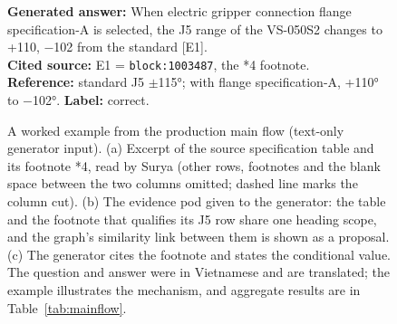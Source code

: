 \begin{figure}[t]
\begin{minipage}[t]{0.26\textwidth}
\textbf{Generated answer:} When electric gripper connection flange specification-A is selected, the J5 range of the VS-050S2 changes to +110, $-$102 from the standard [E1].\\[4pt]
\textbf{Cited source:} E1 = \texttt{block:1003487}, the *4 footnote.\\[4pt]
\textbf{Reference:} standard J5 $\pm$115°; with flange specification-A, +110° to $-$102°. \textbf{Label:} correct.
\end{minipage}
\caption{A worked example from the production main flow (text-only generator input). (a) Excerpt of the source specification table and its footnote *4, read by Surya (other rows, footnotes and the blank space between the two columns omitted; dashed line marks the column cut). (b) The evidence pod given to the generator: the table and the footnote that qualifies its J5 row share one heading scope, and the graph's similarity link between them is shown as a proposal. (c) The generator cites the footnote and states the conditional value. The question and answer were in Vietnamese and are translated; the example illustrates the mechanism, and aggregate results are in Table~\ref{tab:mainflow}.}
\label{fig:p044}
\end{figure}

